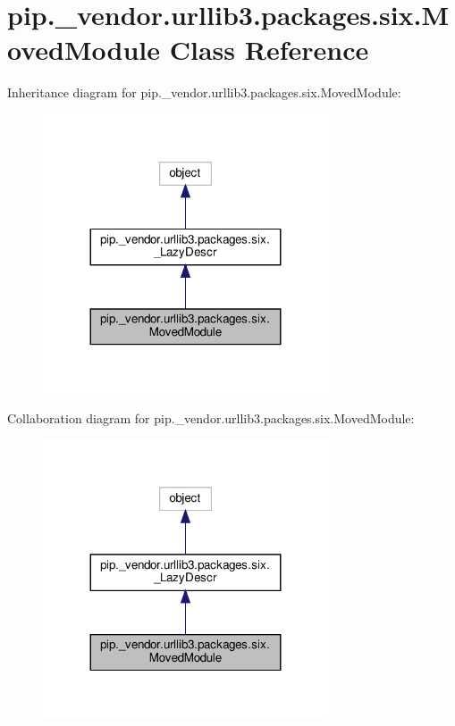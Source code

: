 \hypertarget{classpip_1_1__vendor_1_1urllib3_1_1packages_1_1six_1_1MovedModule}{}\section{pip.\+\_\+vendor.\+urllib3.\+packages.\+six.\+Moved\+Module Class Reference}
\label{classpip_1_1__vendor_1_1urllib3_1_1packages_1_1six_1_1MovedModule}


Inheritance diagram for pip.\+\_\+vendor.\+urllib3.\+packages.\+six.\+Moved\+Module\+:
\nopagebreak
\begin{figure}[H]
\begin{center}
\leavevmode
\includegraphics[width=239pt]{classpip_1_1__vendor_1_1urllib3_1_1packages_1_1six_1_1MovedModule__inherit__graph}
\end{center}
\end{figure}


Collaboration diagram for pip.\+\_\+vendor.\+urllib3.\+packages.\+six.\+Moved\+Module\+:
\nopagebreak
\begin{figure}[H]
\begin{center}
\leavevmode
\includegraphics[width=239pt]{classpip_1_1__vendor_1_1urllib3_1_1packages_1_1six_1_1MovedModule__coll__graph}
\end{center}
\end{figure}
